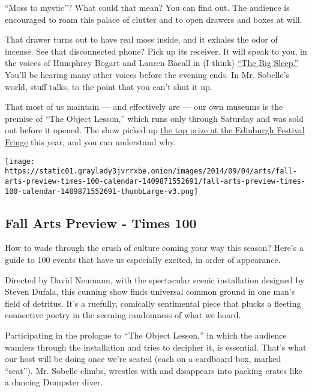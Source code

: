 ``Moss to mystic''? What could that mean? You can find out. The audience
is encouraged to roam this palace of clutter and to open drawers and
boxes at will.

That drawer turns out to have real moss inside, and it exhales the odor
of incense. See that disconnected phone? Pick up its receiver. It will
speak to you, in the voices of Humphrey Bogart and Lauren Bacall in (I
think) \href{https://www.youtube.com/watch?v=VjJlBnfyiI4}{``The Big
Sleep.''} You'll be hearing many other voices before the evening ends.
In Mr. Sobelle's world, stuff talks, to the point that you can't shut it
up.

That most of us maintain --- and effectively are --- our own museums is
the premise of ``The Object Lesson,'' which runs only through Saturday
and was sold out before it opened. The show picked up
\href{http://artsbeat.blogs.nytimes3xbfgragh.onion/2014/08/21/the-object-lesson-takes-a-top-prize-at-edinburgh-festival-fringe/?module=Search\&mabReward=relbias\%3Aw\%2C\%7B\%221\%22\%3A\%22RI\%3A11\%22\%7D\&_r=0}{the
top prize at the Edinburgh Festival Fringe} this year, and you can
understand why.

\href{https://www.nytimes3xbfgragh.onion/interactive/2014/09/04/arts/fall-arts-preview-times-100-calendar.html}{}

\texttt{[image: https://static01.graylady3jvrrxbe.onion/images/2014/09/04/arts/fall-arts-preview-times-100-calendar-1409871552691/fall-arts-preview-times-100-calendar-1409871552691-thumbLarge-v3.png]}

\hypertarget{fall-arts-preview---times-100}{%
\subsection{Fall Arts Preview - Times
100}\label{fall-arts-preview---times-100}}

How to wade through the crush of culture coming your way this season?
Here's a guide to 100 events that have us especially excited, in order
of appearance.

Directed by David Neumann, with the spectacular scenic installation
designed by Steven Dufala, this cunning show finds universal common
ground in one man's field of detritus. It's a ruefully, comically
sentimental piece that plucks a fleeting connective poetry in the
seeming randomness of what we hoard.

Participating in the prologue to ``The Object Lesson,'' in which the
audience wanders through the installation and tries to decipher it, is
essential. That's what our host will be doing once we're seated (each on
a cardboard box, marked ``seat''). Mr. Sobelle climbs, wrestles with and
disappears into packing crates like a dancing Dumpster diver.

